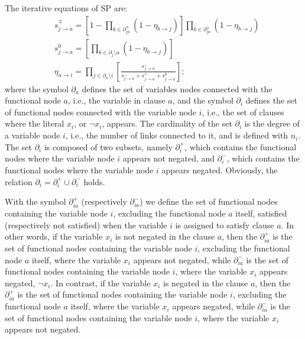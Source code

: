 \documentclass{article}
\begin{document}
The iterative equations of SP are:
\begin{equation}
\label{algoSP}
\begin{split}
&s_{j\to a}^{\mp}=\left[1- \prod_{b \in \partial_{ja}^{\mp}} (1-\eta_{b\to j}) \right]\prod_{b \in \partial_{ja}^{\pm}} (1-\eta_{b\to j})\\
&s_{j\to a}^{0}=\left[\prod_{b \in \partial_{j} \setminus a} (1-\eta_{b\to j}) \right]\\
&\eta_{a\to i}=\prod_{j \in \partial_{a} \setminus i} \left[ \frac{s_{j\to a}^{-}}{s_{j\to a}^{-}+s_{j\to a}^{+}+s_{j\to a}^{0}}\right];
\end{split}
\end{equation}
where the symbol $\partial_a$ defines the set of variables nodes connected with the functional node $a$, i.e., the variable in clause $a$, and the symbol $\partial_i$ defines the set of functional nodes connected with the variable node $i$, i.e., the set of clauses where the literal $x_i$, or $\neg x_i$, appears. The cardinality of the set $\partial_i$ is the degree of a variable node $i$, i.e., the number of links connected to it, and is defined with $n_i$. The set $\partial_i$ is composed of two subsets, namely $\partial_i^+$, which contains the functional nodes where the variable node $i$ appears not negated, and $\partial_i^-$, which contains the functional nodes where the variable node $i$ appears negated. Obviously, the relation $\partial_i= \partial_i^+ \cup \partial_i^-$ holds.

With the symbol $\partial_{ia}^{+}$ (respectively $\partial_{ia}^{-}$) we define the set of functional nodes containing the variable node $i$, excluding the functional node $a$ itself, satisfied (respectively not satisfied) when the variable $i$ is assigned to satisfy clause $a$. In other words, if the variable $x_i$ is not negated in the clause $a$, then the $\partial_{ia}^{+}$ is the set of functional nodes containing the variable node $i$, excluding the functional node $a$ itself, where the variable $x_i$ appears not negated, while $\partial_{ia}^{-}$ is the set of functional nodes containing the variable node $i$, where the variable $x_i$ appears negated, $\neg x_i$. In contrast, if the variable $x_i$ is negated in the clause $a$, then the $\partial_{ia}^{+}$ is the set of functional nodes containing the variable node $i$, excluding the functional node $a$ itself, where the variable $x_i$ appears negated, while $\partial_{ia}^{-}$ is the set of functional nodes containing the variable node $i$, where the variable $x_i$ appears not negated.
 
\end{document}

